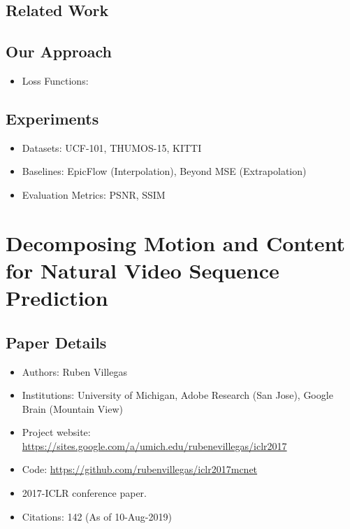 \documentclass{article}
\begin{document}
    \subsection{Related Work}\label{subsec:Video_Frame_Synthesis_using_Deep_Voxel_Flow_(DVF):related-work}

    \subsection{Our Approach}\label{subsec:Video_Frame_Synthesis_using_Deep_Voxel_Flow_(DVF):our-approach}
    \begin{itemize}
        \item Loss Functions:
    \end{itemize}

    \subsection{Experiments}\label{subsec:Video_Frame_Synthesis_using_Deep_Voxel_Flow_(DVF):experiments}
    \begin{itemize}
        \item Datasets: UCF-101, THUMOS-15, KITTI
        \item Baselines: EpicFlow (Interpolation), Beyond MSE (Extrapolation)
        \item Evaluation Metrics: PSNR, SSIM
    \end{itemize}
    \newpage


    \section{Decomposing Motion and Content for Natural Video Sequence Prediction}\label{sec:Decomposing_Motion_and_Content_for_Natural_Video_Sequence_Prediction}
    \subsection*{Paper Details}
    \begin{itemize}
        \item Authors: Ruben Villegas
        \item Institutions: University of Michigan, Adobe Research (San Jose), Google Brain (Mountain View)
        \item Project website: \url{https://sites.google.com/a/umich.edu/rubenevillegas/iclr2017}
        \item Code: \url{https://github.com/rubenvillegas/iclr2017mcnet}
        \item 2017-ICLR conference paper.
        \item Citations: 142 (As of 10-Aug-2019)
    \end{itemize}
\end{document}
